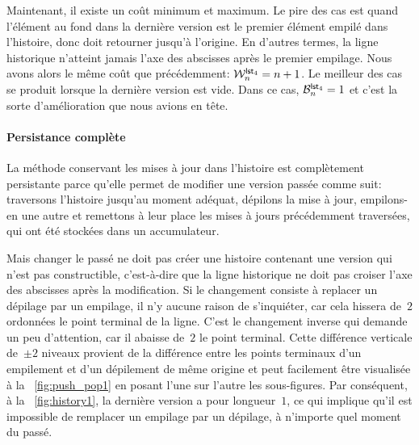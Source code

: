 Maintenant, il existe un coût minimum et maximum. Le pire des cas est
quand l'élément au fond dans la dernière version est le premier
élément empilé dans l'histoire, donc
 doit retourner jusqu'à
l'origine. En d'autres termes, la ligne historique n'atteint jamais
l'axe des abscisses après le premier empilage. Nous avons alors le
même coût que précédemment: \(\W{\fun{lst}_4}{n} = n +
1\).  Le meilleur des cas se produit lorsque la dernière version est vide. Dans ce cas, \(\B{\fun{lst}_4}{n} =
1\) et c'est la sorte d'amélioration que nous avions en tête.


\paragraph{Persistance complète}

La méthode conservant les mises à jour dans l'histoire est
complètement persistante parce qu'elle permet de modifier une version
passée comme suit: traversons l'histoire jusqu'au moment adéquat,
dépilons la mise à jour, empilons-en une autre et remettons à leur
place les mises à jours précédemment traversées, qui ont été stockées
dans un accumulateur.

Mais changer le passé ne doit pas créer une histoire contenant une
version qui n'est pas constructible, c'est-à-dire que la ligne
historique ne doit pas croiser l'axe des abscisses après la
modification. Si le changement consiste à replacer un dépilage par un
empilage, il n'y aucune raison de s'inquiéter, car cela hissera
de~\(2\) ordonnées le point terminal de la ligne. C'est le changement
inverse qui demande un peu d'attention, car il abaisse de~\(2\) le
point terminal. Cette différence verticale de~\(\pm 2\) niveaux
provient de la différence entre les points terminaux d'un empilement
et d'un dépilement de même origine et peut facilement être visualisée
à la \fig~\vref{fig:push_pop1} en posant l'une sur l'autre les
sous-figures. Par conséquent, à la \fig~\ref{fig:history1}, la
dernière version a pour longueur~\(1\), ce qui implique qu'il est
impossible de remplacer un empilage par un dépilage, à n'importe quel
moment du passé.

